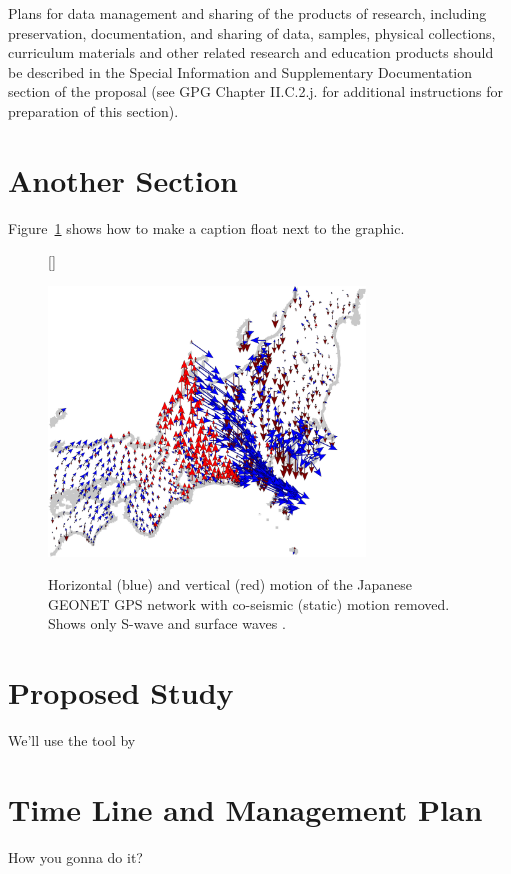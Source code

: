 \documentclass{proposalnsf}
\begin{document}
Plans for data management and sharing of the products of research, including preservation, documentation, and
sharing of data, samples, physical collections, curriculum materials and other related research and education
products should be described in the Special Information and Supplementary Documentation section of the
proposal (see GPG Chapter II.C.2.j. for additional instructions for preparation of this section).

\section{Another Section}
Figure~\ref{fig:caption} shows how to make a caption float next to the graphic.

\begin{center}
\begin{figure}[!ht]
[\FBwidth]
{\caption{\label{fig:caption} Horizontal (blue) and vertical (red) motion of the Japanese GEONET GPS network
with co-seismic (static) motion removed. Shows only S-wave and surface waves \citep[e.g.,][]{Grapenthin2011}.}}
{\includegraphics[width=0.75\textwidth]{figure.pdf}}
\end{figure}
\end{center}

\section{Proposed Study}
We'll use the tool by \citet{Grapenthin2014}

\section{Time Line and Management Plan}
How you gonna do it?
\end{document}

